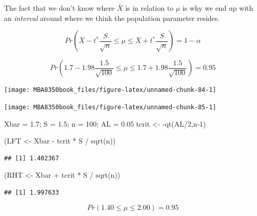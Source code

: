 \documentclass[
]{book}
\newenvironment{Shaded}{\begin{snugshade}}{\end{snugshade}}
\newcommand{\DecValTok}[1]{\textcolor[rgb]{0.00,0.00,0.81}{#1}}
\newcommand{\FloatTok}[1]{\textcolor[rgb]{0.00,0.00,0.81}{#1}}
\newcommand{\FunctionTok}[1]{\textcolor[rgb]{0.00,0.00,0.00}{#1}}
\newcommand{\NormalTok}[1]{#1}
\newcommand{\OtherTok}[1]{\textcolor[rgb]{0.56,0.35,0.01}{#1}}
\newcommand{\SpecialCharTok}[1]{\textcolor[rgb]{0.00,0.00,0.00}{#1}}
\begin{document}
The fact that we don't know where \(\bar{X}\) is in relation to \(\mu\) is why we end up with an \emph{interval} around where we think the population parameter resides.

\[Pr(\bar{X}-t^* \frac{S}{\sqrt{n}} \leq \mu \leq \bar{X}+t^* \frac{S}{\sqrt{n}}) = 1-\alpha\]

\[Pr(1.7-1.98 \frac{1.5}{\sqrt{100}} \leq \mu \leq 1.7+1.98 \frac{1.5}{\sqrt{100}}) = 0.95\]

\begin{center}\texttt{[image: MBA8350book\_files/figure-latex/unnamed-chunk-84-1]} \end{center}

\begin{center}\texttt{[image: MBA8350book\_files/figure-latex/unnamed-chunk-85-1]} \end{center}

\begin{Shaded}
\begin{Highlighting}[]
\NormalTok{Xbar }\OtherTok{=} \FloatTok{1.7}\NormalTok{; S }\OtherTok{=} \FloatTok{1.5}\NormalTok{; n }\OtherTok{=} \DecValTok{100}\NormalTok{; AL }\OtherTok{=} \FloatTok{0.05}
\NormalTok{tcrit }\OtherTok{\textless{}{-}} \SpecialCharTok{{-}}\FunctionTok{qt}\NormalTok{(AL}\SpecialCharTok{/}\DecValTok{2}\NormalTok{,n}\DecValTok{{-}1}\NormalTok{)}

\NormalTok{(LFT }\OtherTok{\textless{}{-}}\NormalTok{ Xbar }\SpecialCharTok{{-}}\NormalTok{ tcrit }\SpecialCharTok{*}\NormalTok{ S }\SpecialCharTok{/} \FunctionTok{sqrt}\NormalTok{(n))}
\end{Highlighting}
\end{Shaded}

\begin{verbatim}
## [1] 1.402367
\end{verbatim}

\begin{Shaded}
\begin{Highlighting}[]
\NormalTok{(RHT }\OtherTok{\textless{}{-}}\NormalTok{ Xbar }\SpecialCharTok{+}\NormalTok{ tcrit }\SpecialCharTok{*}\NormalTok{ S }\SpecialCharTok{/} \FunctionTok{sqrt}\NormalTok{(n))}
\end{Highlighting}
\end{Shaded}

\begin{verbatim}
## [1] 1.997633
\end{verbatim}

\[Pr(1.40 \leq \mu \leq 2.00) = 0.95\]
\end{document}
